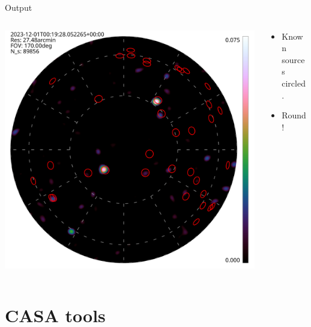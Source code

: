 \documentclass[ignorenonframetext]{beamer}
\begin{document}
\begin{frame}{Output}
\begin{columns}
 \begin{column}{0.7\linewidth}
\includegraphics[width=\linewidth]{images/obs_00000.hdf.png}
 \end{column}
 \begin{column}{0.3\linewidth}
 \begin{itemize}
  \item Known sources circled.
  \item Round!
 \end{itemize}
 \end{column}
\end{columns}
\end{frame}

\section{CASA tools}
\end{document}
